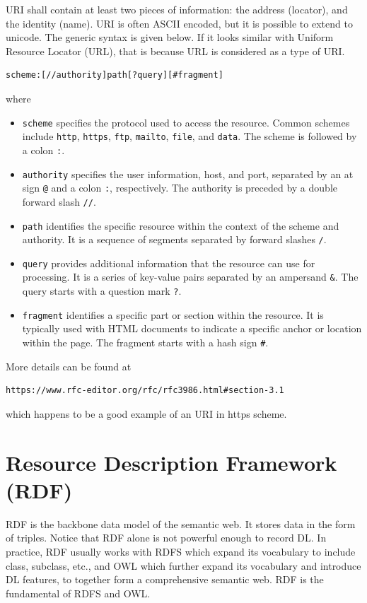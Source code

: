 URI shall contain at least two pieces of information: the address (locator), and the identity (name). URI is often ASCII encoded, but it is possible to extend to unicode. The generic syntax is given below. If it looks similar with Uniform Resource Locator (URL), that is because URL is considered as a type of URI.
\begin{lstlisting}
scheme:[//authority]path[?query][#fragment]
\end{lstlisting}
where
\begin{itemize}
\item \verb|scheme| specifies the protocol used to access the resource. Common schemes include \verb|http|, \verb|https|, \verb|ftp|, \verb|mailto|, \verb|file|, and \verb|data|. The scheme is followed by a colon \verb|:|.
\item \verb|authority| specifies the user information, host, and port, separated by an at sign \verb|@| and a colon \verb|:|, respectively. The authority is preceded by a double forward slash \verb|//|.
\item \verb|path| identifies the specific resource within the context of the scheme and authority. It is a sequence of segments separated by forward slashes \verb|/|.
\item \verb|query| provides additional information that the resource can use for processing. It is a series of key-value pairs separated by an ampersand \verb|&|. The query starts with a question mark \verb|?|.
\item \verb|fragment| identifies a specific part or section within the resource. It is typically used with HTML documents to indicate a specific anchor or location within the page. The fragment starts with a hash sign \verb|#|.
\end{itemize}
More details can be found at
\begin{lstlisting}
https://www.rfc-editor.org/rfc/rfc3986.html#section-3.1
\end{lstlisting}
which happens to be a good example of an URI in https scheme.

\section{Resource Description Framework (RDF)}

RDF is the backbone data model of the semantic web. It stores data in the form of triples. Notice that RDF alone is not powerful enough to record DL. In practice, RDF usually works with RDFS which expand its vocabulary to include class, subclass, etc., and OWL which further expand its vocabulary and introduce DL features, to together form a comprehensive semantic web. RDF is the fundamental of RDFS and OWL.

